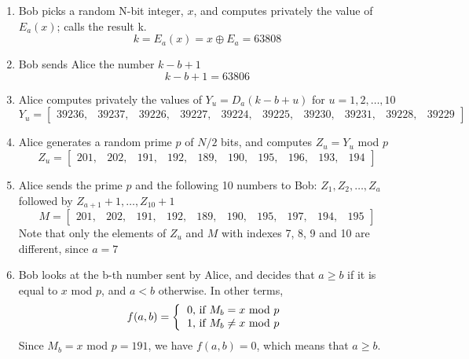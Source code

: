 \begin{refsection}
\begin{enumerate}
\item Bob picks a random N-bit integer, $x$, and computes privately the value of $E_a(x)$; calls the result k.
\begin{equation}\label{eq:encryptingX}
k = E_a(x) = x \oplus E_a = 63808
\end{equation}
\item Bob sends Alice the number $k - b + 1$
\begin{equation}\label{eq:encryptingX}
k - b + 1 = 63806
\end{equation}
\item Alice computes privately the values of $Y_u = D_a(k - b + u)$ for $u = 1,2,\ldots,10$\\
\[
Y_u = \begin{bmatrix}
        39236,&39237,&39226,&39227,&39224,&39225,&39230,&39231,&39228,&39229
      \end{bmatrix}
\]
\item Alice generates a random prime $p$ of $N/2$ bits, and computes $Z_u = Y_u$  mod  $p$
\[
Z_u = \begin{bmatrix}
        201,&202,&191,&192,&189,&190,&195,&196,&193,&194
      \end{bmatrix}
\]
\item Alice sends the prime $p$ and the following 10 numbers to Bob: $Z_1,Z_2,\ldots,Z_a$
followed by $Z_{a+1}+1,\ldots,Z_{10}+1$
\[
M = \begin{bmatrix}
        201,&202,&191,&192,&189,&190,&195,&197,&194,&195
      \end{bmatrix}
\]
Note that only the elements of $Z_u$ and $M$ with indexes 7, 8, 9 and 10 are different, since $a = 7$
\item Bob looks at the b-th number sent by Alice, and decides that $a \geq b$ if it is equal to $x$ mod $p$,
and $a < b$ otherwise. In other terms,
\[
f(a,b) = \left \{
          \begin{tabular}{ccc}
          0, if $M_b = x$ mod $p$ \\
          1, if $M_b \ne x$ mod $p$
          \end{tabular}
        \right.
\]
Since $M_b = x$ mod $p = 191$, we have $f(a,b) = 0$, which means that $a \geq b$.
\end{enumerate}



\end{refsection}
